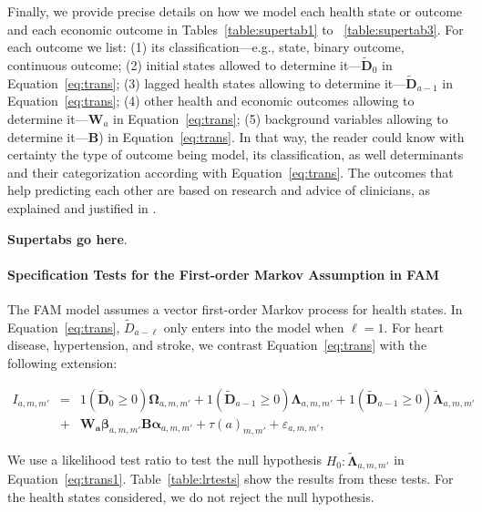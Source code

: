 Finally, we provide precise details on how we model each health state or outcome and each economic outcome in Tables~\ref{table:supertab1} to ~\ref{table:supertab3}. For each outcome we list: (1) its classification---e.g., state, binary outcome, continuous outcome; (2) initial states allowed to determine it---$\tilde{\bm{D}}_0$ in Equation~\eqref{eq:trans}; (3) lagged health states allowing to determine it---$\tilde{\bm{D}}_{a-1}$ in Equation~\eqref{eq:trans}; (4) other health and economic outcomes allowing to determine it---$\bm{W}_a$ in Equation~\eqref{eq:trans}; (5) background variables allowing to determine it---$\bm{B}$) in Equation~\eqref{eq:trans}. In that way, the reader could know with certainty the type of outcome being model, its classification, as well determinants and their categorization according with Equation~\eqref{eq:trans}. The outcomes that help predicting each other are based on research and advice of clinicians, as explained and justified in \citet{Goldman_etal_2015_Future-Elderly-Model-Report}.

\textbf{Supertabs go here}.

\paragraph{Specification Tests for the First-order Markov Assumption in FAM} \label{section:firstorder}

\noindent The FAM model assumes a vector first-order Markov process for health states. In Equation~\eqref{eq:trans}, $\tilde{D}_{a - \ell}$ only enters into the model when $\ell = 1$. For heart disease, hypertension, and stroke, we contrast Equation~\eqref{eq:trans} with the following extension: 

\begin{eqnarray}
I_{a,m,m'} &=& \bm{\mathit{1}} \left( \tilde{\bm{D}}_{0} \geq 0 \right) \bm{\Omega}_{a,m,m'} + \bm{\mathit{1}} \left( \tilde{\bm{D}}_{a-1} \geq 0\right) \bm{\Lambda}_{a,m,m'}  + \bm{\mathit{1}} \left( \tilde{\bm{D}}_{a-1} \geq 0\right) \tilde{\bm{\Lambda}}_{a,m,m'} \nonumber \\ 
&+&  \bm{W_a} \bm{\beta}_{a,m,m'}  \bm{B} \bm{\alpha}_{a,m,m'} + \tau \left( a \right)_{m,m'} + \varepsilon_{a,m,m'}, \label{eq:trans1}
\end{eqnarray}

We use a likelihood test ratio to test the null hypothesis $H_0: \tilde{\bm{\Lambda}}_{a,m,m'}$ in Equation~\eqref{eq:trans1}. Table~\ref{table:lrtests} show the results from these tests. For the health states considered, we do not reject the null hypothesis.

